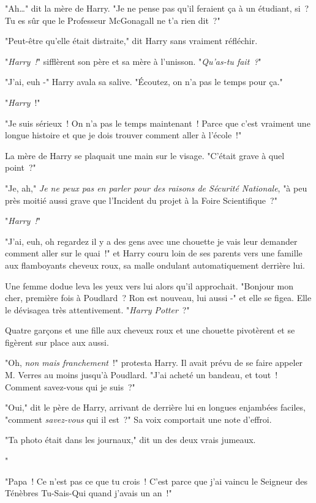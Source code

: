 "Ah…" dit la mère de Harry. "Je ne pense pas qu'il feraient ça à un étudiant, si~? Tu es sûr que le Professeur McGonagall ne t'a rien dit~?"

"Peut-être qu'elle était distraite," dit Harry sans vraiment réfléchir.

"\emph{Harry~!}" sifflèrent son père et sa mère à l'unisson. "\emph{Qu'as-tu fait~?}"

"J'ai, euh -" Harry avala sa salive. "Écoutez, on n'a pas le temps pour ça."

"\emph{Harry}~!"

"Je suis sérieux~! On n'a pas le temps maintenant~! Parce que c'est vraiment une longue histoire et que je dois trouver comment aller à l'école~!"

La mère de Harry se plaquait une main sur le visage. "C'était grave à quel point~?"

"Je, ah," \emph{Je ne peux pas en parler pour des raisons de Sécurité Nationale}, "à peu près moitié aussi grave que l'Incident du projet à la Foire Scientifique~?"

"\emph{Harry~!}"

"J'ai, euh, oh regardez il y a des gens avec une chouette je vais leur demander comment aller sur le quai~!" et Harry couru loin de ses parents vers une famille aux flamboyants cheveux roux, sa malle ondulant automatiquement derrière lui.

Une femme dodue leva les yeux vers lui alors qu'il approchait. "Bonjour mon cher, première fois à Poudlard~? Ron est nouveau, lui aussi -" et elle se figea. Elle le dévisagea très attentivement. "\emph{Harry Potter}~?"

Quatre garçons et une fille aux cheveux roux et une chouette pivotèrent et se figèrent sur place aux aussi.

"Oh, \emph{non mais franchement}~!" protesta Harry. Il avait prévu de se faire appeler M. Verres au moins jusqu'à Poudlard. "J'ai acheté un bandeau, et tout~! Comment savez-vous qui je suis~?"

"Oui," dit le père de Harry, arrivant de derrière lui en longues enjambées faciles, "comment \emph{savez-vous} qui il est~?" Sa voix comportait une note d'effroi.

"Ta photo était dans les journaux," dit un des deux vrais jumeaux.

"

"Papa~! Ce n'est pas ce que tu crois~! C'est parce que j'ai vaincu le Seigneur des Ténèbres Tu-Sais-Qui quand j'avais un an~!"

